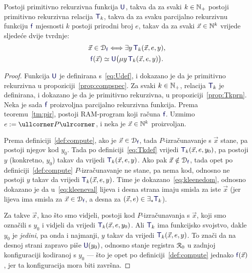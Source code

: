 \begin{teorem}\label{tm:Kleene}
Postoji primitivno rekurzivna funkcija $\f U$, takva da za svaki $k\in{\mathbb N}_+$ postoji primitivno rekurzivna relacija $\f T_k$, takva da za svaku parcijalno rekurzivnu funkciju $\f f$ mjesnosti $k$ postoji prirodni broj $e$, takav da za svaki $\vec x\in{\mathbb N}^k$ vrijede sljedeće dvije tvrdnje:
\begin{gather}
    \label{eq:kleenedom}\vec x\in\dom{\f f}\Longleftrightarrow\exists y\,\f T_k(\vec x,e,y)\text,\\
    \label{eq:kleeneval}\f f(\vec x)\simeq\f U\bigl(\mu y\,\f T_k(\vec x,e,y)\bigr)\text.
\end{gather}
\end{teorem}
\begin{proof}
Funkcija $\f U$ je definirana s~\eqref{eq:Udef}, i dokazano je da je primitivno rekurzivna u propoziciji~\ref{prop:compspec}. Za svaki $k\in{\mathbb N}_+$, relacija $\f T_k$ je definirana, i dokazano je da je primitivno rekurzivna, u propoziciji~\ref{prop:Tkprn}. Neka je sada $\f f$ proizvoljna parcijalno rekurzivna funkcija. Prema teoremu~\ref{tm:pir}, postoji RAM-program koji računa $\f f$. Uzmimo $e:=\kprog P$, i neka je $\vec x\in{\mathbb N}^k$ proizvoljan.

Prema definiciji~\ref{def:compute}, ako je $\vec x\in\dom{\f f}$, tada $P$-izračunavanje s $\vec x$ stane, pa postoji njegov kod $y_0$. Tada po definiciji~\eqref{eq:Tkdef} vrijedi $\f T_k(\vec x,e,y_0)$, pa postoji $y$ (konkretno, $y_0$) takav da vrijedi $\f T_k(\vec x,e,y)$. Ako pak $\vec x\notin\dom{\f f}$, tada opet po definiciji~\ref{def:compute} $P$-izračunavanje ne stane, pa nema kod, odnosno ne postoji $y$ takav da vrijedi $\f T_k(\vec x,e,y)$. Time je dokazano~\eqref{eq:kleenedom}, odnosno dokazano je da u~\eqref{eq:kleeneval} lijeva i desna strana imaju smisla za iste $\vec x$ (jer lijeva ima smisla za $\vec x\in\dom{\f f}$, a desna za $(\vec x,e)\in\exists_*\f T_k$).

Za takve $\vec x$, kao što smo vidjeli, postoji kod $P$-izračunavanja s $\vec x$, koji smo označili s $y_0$ i vidjeli da vrijedi $\f T_k(\vec x,e,y_0)$. Ali $\f T_k$ ima funkcijsko svojstvo, dakle $y_0$ je \emph{jedini}, pa onda i najmanji, $y$ takav da vrijedi $\f T_k(\vec x,e,y)$. To znači da na desnoj strani zapravo piše $\f U(y_0)$, odnosno stanje registra $\mathcal R_{0}$ u zadnjoj konfiguraciji kodiranoj s $y_0$ --- što je opet po definiciji~\ref{def:compute} jednako $\f f(\vec x)$, jer ta konfiguracija mora biti završna.
\end{proof}


